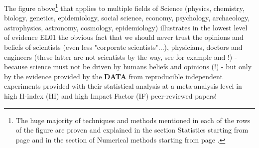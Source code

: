 	The figure above\footnote{The huge majority of techniques and methods mentioned in each of the rows of the figure are proven and explained in the section Statistics starting from page \pageref{statistics} and in the section of Numerical methods starting from page \pageref{regression techniques}.} that applies to multiple fields of Science (physics, chemistry, biology, genetics, epidemiology, social science, economy, psychology, archaeology, astrophysics, astronomy, cosmology, epidemiology) illustrates in the lowest level of evidence EL01 the obvious fact that we should never trust the opinions and beliefs of scientists (even less "corporate scientists"...), physicians, doctors and engineers (these latter are not scientists by the way, see for example \cite{smith2004doctors} and \cite{freed2004doctors}!) - because science must not be driven by humans beliefs and opinions (!) - but only by the evidence provided by the \textbf{\underline{DATA}} from reproducible independent experiments provided with their statistical analysis at a meta-analysis level in high H-index (HI) and high Impact Factor (IF) peer-reviewed papers!
	
